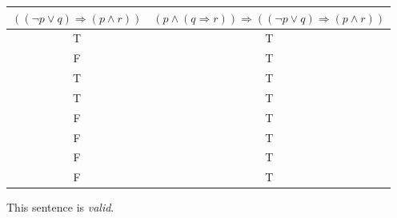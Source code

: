 \documentclass{article}
\begin{document}
\begin{enumerate}
\begin{enumerate}
			\begin{tabular}{|c|c|}
				\hline
				$ (( \neg p \vee q) \Rightarrow ( p \wedge r))$ 
				& $(p \wedge ( q \Rightarrow r)) \Rightarrow (( \neg p \vee q) \Rightarrow ( p \wedge r))$\\
				\hline
				T & T\\
				\hline
				F & T\\
				\hline
				T & T\\
				\hline
				T & T\\
				\hline
				F & T\\
				\hline
				F & T\\
				\hline
				F & T\\
				\hline
				F & T\\
				\hline
			\end{tabular}
		\end{enumerate}
		
		This sentence is \emph{valid}.
\end{enumerate}
\end{document}
